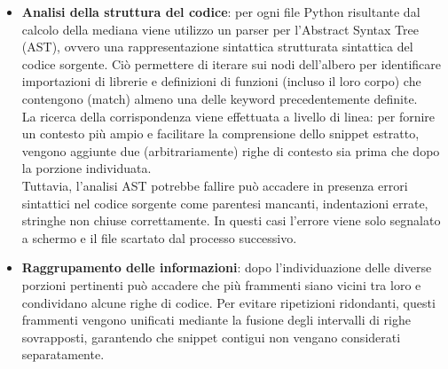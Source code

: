 \documentclass{article}
\begin{document}
\begin{itemize}
    \item \textbf{Analisi della struttura del codice}: per ogni file Python risultante dal calcolo della mediana viene utilizzo un parser per l'Abstract Syntax Tree (AST), ovvero una rappresentazione sintattica strutturata sintattica del codice sorgente. Ciò permettere di iterare sui nodi dell'albero per identificare importazioni di librerie e definizioni di funzioni (incluso il loro corpo) che contengono (match) almeno una delle keyword precedentemente definite. \\
    La ricerca della corrispondenza viene effettuata a livello di linea: per fornire un contesto più ampio e facilitare la comprensione dello snippet estratto, vengono aggiunte due (arbitrariamente) righe di contesto sia prima che dopo la porzione individuata.\\
    Tuttavia, l’analisi AST potrebbe fallire può accadere in presenza errori sintattici nel codice sorgente come parentesi mancanti, indentazioni errate, stringhe non chiuse correttamente. In questi casi l'errore viene solo segnalato a schermo e il file scartato dal processo successivo.
    
    \item \textbf{Raggrupamento delle informazioni}: dopo l'individuazione delle diverse porzioni pertinenti può accadere che più frammenti siano vicini tra loro e condividano alcune righe di codice. Per evitare ripetizioni ridondanti, questi frammenti vengono unificati mediante la fusione degli intervalli di righe sovrapposti, garantendo che snippet contigui non vengano considerati separatamente. 


\end{itemize}
\end{document}
